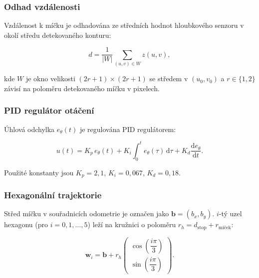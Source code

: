 \documentclass[12pt, a4paper, oneside]{article}
\begin{document}
\subsubsection{Odhad vzdálenosti}

Vzdálenost k míčku je odhadována ze středních hodnot hloubkového senzoru
v okolí středu detekovaného konturu:

\begin{equation}
  d = \frac{1}{|W|} \sum_{(u,v)\in W} z(u,v),
  \label{eq:depth_estimate}
\end{equation}

kde $W$ je okno velikosti $(2r+1) \times (2r+1)$ se středem v $(u_0, v_0)$
a $r \in \{1, 2\}$ závisí na poloměru detekovaného míčku v pixelech.

\subsubsection{PID regulátor otáčení}

Úhlová odchylka $e_\theta(t)$ je regulována PID regulátorem:

\begin{equation}
  u(t) = K_p\, e_\theta(t)
         + K_i \int_0^t e_\theta(\tau)\,\mathrm{d}\tau
         + K_d \frac{\mathrm{d}e_\theta}{\mathrm{d}t}.
  \label{eq:pid}
\end{equation}

Použité konstanty jsou $K_p = 2{,}1$, $K_i = 0{,}067$, $K_d = 0{,}18$.

\subsubsection{Hexagonální trajektorie}

Střed míčku v souřadnicích odometrie je označen jako $\mathbf{b} = (b_x, b_y)$.
$i$-tý uzel hexagonu (pro $i = 0, 1, \ldots, 5$) leží na kružnici
o poloměru $r_h = d_{\text{stop}} + r_{\text{míček}}$:

\begin{equation}
  \mathbf{w}_i = \mathbf{b} +
    r_h \begin{pmatrix} \cos\!\left(\dfrac{i\pi}{3}\right) \\[4pt]
                        \sin\!\left(\dfrac{i\pi}{3}\right) \end{pmatrix}.
  \label{eq:hexagon}
\end{equation}

\end{document}
